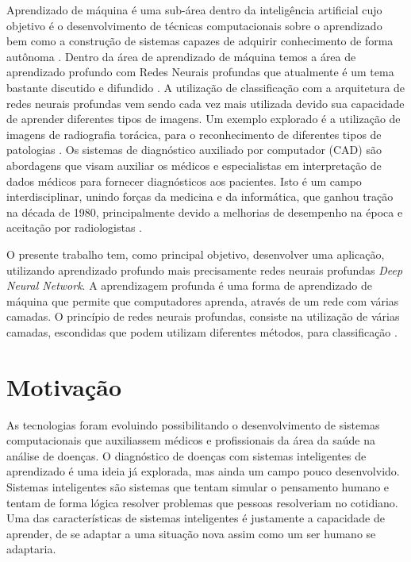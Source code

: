 \documentclass[openright]{UFRGS} %
\begin{document}
Aprendizado de máquina é uma sub-área dentro da inteligência artificial cujo objetivo é o desenvolvimento de técnicas computacionais sobre o aprendizado bem como a construção de sistemas capazes de adquirir conhecimento de forma autônoma \cite{lorena2000inteligencia}. Dentro da área de aprendizado de máquina temos a área de aprendizado profundo com Redes Neurais profundas que atualmente é um tema bastante discutido e difundido \cite{azevedo2018computaccao}. A utilização de classificação com a arquitetura de redes neurais profundas vem sendo cada vez mais utilizada  devido sua capacidade de aprender diferentes tipos de imagens. Um exemplo explorado é a utilização de imagens de radiografia torácica, para o reconhecimento de diferentes tipos de patologias \cite{bar2015deep}. Os sistemas de diagnóstico auxiliado por computador (CAD) são abordagens que visam auxiliar os médicos
e especialistas em interpretação de dados médicos para fornecer diagnósticos aos pacientes. Isto é
um campo interdisciplinar, unindo forças da medicina e da informática, que ganhou
tração na década de 1980, principalmente devido a melhorias de desempenho na época e aceitação
por radiologistas \cite{jiang1999improving}.  

 
O presente trabalho tem, como principal objetivo, desenvolver uma aplicação, utilizando aprendizado profundo mais precisamente redes neurais profundas \textit{Deep Neural Network}. A aprendizagem profunda é uma forma de aprendizado de máquina que permite que
computadores aprenda, através de um rede com várias camadas.
O princípio  de  redes neurais profundas, 
consiste na utilização de várias camadas, 
escondidas que podem utilizam diferentes métodos, 
para classificação \cite{goodfellow2016deep}. 


\section{Motivação}

As tecnologias foram evoluindo possibilitando o desenvolvimento de sistemas computacionais que auxiliassem médicos e profissionais da área da saúde na análise de doenças. O diagnóstico de doenças com sistemas inteligentes de aprendizado é uma ideia já explorada, mas ainda um campo pouco desenvolvido. Sistemas inteligentes são sistemas que tentam simular o pensamento humano e tentam de forma lógica resolver problemas que pessoas resolveriam no cotidiano. Uma das características de sistemas inteligentes é justamente a capacidade de aprender, de se adaptar a uma situação nova assim como um ser humano se adaptaria. 
\end{document}
